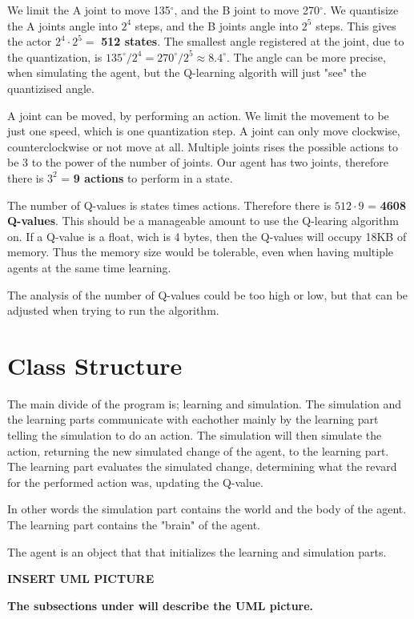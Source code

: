 \documentclass{article}
\begin{document}
We limit the A joint to move 135$^\circ$, and the B joint to move
270$^\circ$. We quantisize the A joints angle into $2^4$ steps, and
the B joints angle into $2^5$ steps. This gives the actor
$2^4 \cdot 2^5 =$ \textbf{512 states}. The smallest angle registered at
the joint, due to the quantization, is
$135^\circ / 2^4 = 270^\circ / 2^5 \approx 8.4^\circ$.
The angle can be more precise, when simulating the agent, but the
Q-learning algorith will just "see" the quantizised angle.

A joint can be moved, by performing an action. We limit the movement to be
just one speed, which is one quantization step. A joint can only move
clockwise, counterclockwise or not move at all. Multiple joints rises the
possible actions to be 3 to the power of the number of joints. Our
agent has two joints, therefore there is $3^2$ = \textbf{9 actions} to
perform in a state.

The number of Q-values is states times actions. Therefore there is
$512 \cdot 9$ = \textbf{4608 Q-values}. This should be a manageable
amount to use the Q-learing algorithm on. If a Q-value is a float,
wich is 4 bytes, then the Q-values will occupy 18KB of memory.
Thus the memory size would be tolerable, even when having multiple agents
at the same time learning.

The analysis of the number of Q-values could be too high or low, but that
can be adjusted when trying to run the algorithm.



\section{Class Structure}
The main divide of the program is; learning and simulation. The
simulation and the learning parts communicate with eachother mainly by the
learning part telling the simulation to do an action. The simulation will then
simulate the action, returning the new simulated change of the agent, to the
learning part. The learning part evaluates the simulated change, determining
what the revard for the performed action was, updating the Q-value.

In other words the simulation part contains the world and the body of the agent.
The learning part contains the "brain" of the agent.

The agent is an object that that initializes the learning and simulation parts.

\textbf{INSERT UML PICTURE}

\textbf{The subsections under will describe the UML picture.}
\end{document}
